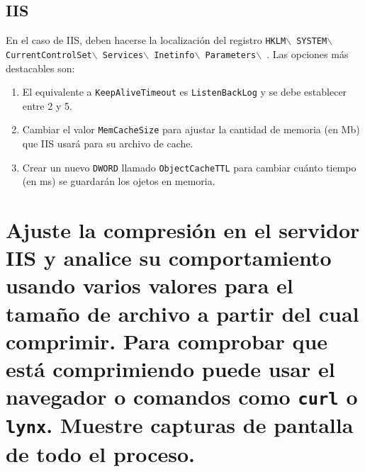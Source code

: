 \documentclass[10pt,a4paper,spanish]{article}
\numberwithin{equation}{section} %
\numberwithin{figure}{section} %
\numberwithin{table}{section} %
\begin{document}
\subsection{IIS}
En el caso de IIS, deben hacerse la localización del registro \texttt{HKLM$\backslash$ SYSTEM$\backslash$ CurrentControlSet$\backslash$ Services$\backslash$ Inetinfo$\backslash$ Parameters$\backslash$ }. Las opciones más destacables son:
\begin{enumerate}[$\bullet$]
    \item El equivalente a \texttt{KeepAliveTimeout} es \texttt{ListenBackLog} y se debe establecer entre 2 y 5.
    \item Cambiar el valor \texttt{MemCacheSize} para ajustar la cantidad de memoria (en Mb) que IIS usará para su archivo de cache.
    \item Crear un nuevo \texttt{DWORD} llamado \texttt{ObjectCacheTTL} para cambiar cuánto tiempo (en ms) se guardarán los ojetos en memoria.
\end{enumerate}

\section{Ajuste la compresión en el servidor IIS y analice su comportamiento usando varios valores para el tamaño de archivo a partir del cual comprimir. Para comprobar que está comprimiendo puede usar el navegador o comandos como \texttt{curl} o \texttt{lynx}. Muestre capturas de pantalla de todo el proceso.}
\end{document}
